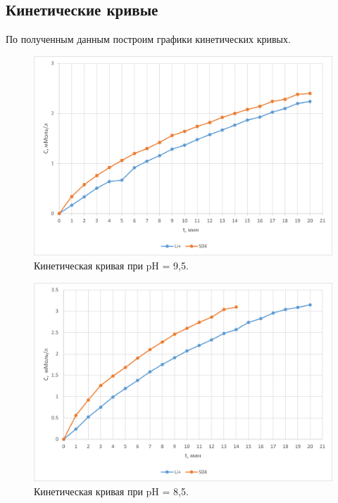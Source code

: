 \documentclass[a4paper,12pt]{article} %
\begin{document}
\subsection{Кинетические кривые}
По полученным данным построим графики кинетических кривых.
\begin{figure}[H]
    \centering
    \includegraphics[scale=1]{Рисунок1.png}
    \caption{Кинетическая кривая при pH = 9,5.
}
    \label{pic:1}
\end{figure}

\begin{figure}[H]
    \centering
    \includegraphics[scale=1]{Рисунок2.png}
    \caption{Кинетическая кривая при pH = 8,5.
}
    \label{pic:2}
\end{figure}
\end{document}
